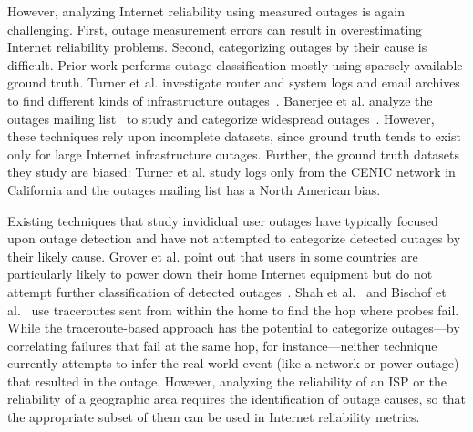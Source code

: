 
However, analyzing Internet reliability using measured outages is
again challenging. First, outage measurement errors can result in
overestimating Internet reliability problems. Second, categorizing
outages by their cause is difficult. Prior work performs
outage classification mostly using sparsely available ground
truth. Turner et al. investigate router and system logs and email
archives to find different kinds of infrastructure
outages~\cite{california-fault-lines}. Banerjee et al. analyze the
outages mailing list~\cite{outages-mailing-list} to study and
categorize widespread
outages~\cite{phillipa-outages-mailing-list}. However, these
techniques rely upon incomplete datasets, since ground truth tends to
exist only for large Internet infrastructure outages. Further, the
ground truth datasets they study are biased: Turner et al. study logs only
from the CENIC network in California and the outages mailing list has
a North American bias. 

Existing techniques that study invididual user
outages have typically focused upon outage detection and have not
attempted to categorize detected outages by their likely cause. Grover
et al. point out that users in some countries are particularly likely
to power down their home Internet equipment but do not attempt further
classification of detected outages~\cite{grover2013peeking}. Shah et
al.~\cite{disco} and Bischof et al.~\cite{alwayson} use traceroutes sent from within the
home to find the hop where probes fail. While the traceroute-based
approach has the potential to categorize outages---by correlating
failures that fail at the same hop, for instance---neither technique currently
attempts to infer the real world event (like a network or power
outage) that resulted in the outage. However, analyzing the reliability of an
ISP or the reliability of a geographic area requires the
identification of outage causes, so that the appropriate subset of
them can be used in Internet reliability metrics. 




